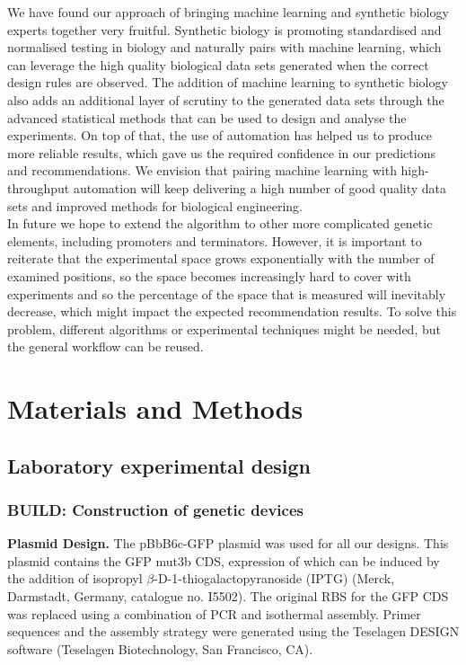 \documentclass{scrartcl}[2013/05/29]%
\begin{document}
We have found our approach of bringing machine learning and synthetic biology experts together very fruitful.
Synthetic biology is promoting standardised and normalised testing in biology and naturally pairs with machine learning, which can leverage the high quality biological data sets generated when the correct design rules are observed.
The addition of machine learning to synthetic biology also adds an additional layer of scrutiny to the generated data sets through the advanced statistical methods that can be used to design and analyse the experiments.
On top of that, the use of automation has helped us to produce more reliable results, which gave us the required confidence in our predictions and recommendations.
We envision that pairing machine learning with high-throughput automation will keep delivering a high number of good quality data sets and improved methods for biological engineering.\\

In future we hope to extend the algorithm to other more complicated genetic elements, including promoters and terminators.
However, it is important to reiterate that the experimental space grows exponentially with the number of examined positions, so the space becomes increasingly hard to cover with experiments and so the percentage of the space that is measured will inevitably decrease, which might impact the expected recommendation results.
To solve this problem, different algorithms or experimental techniques might be needed, but the general workflow can be reused.\\


\section{Materials and Methods}

\subsection{Laboratory experimental design}

\subsubsection{BUILD: Construction of genetic devices}

\textbf{Plasmid Design.}
The pBbB6c-GFP plasmid was used for all our designs.
This plasmid contains the GFP mut3b CDS, expression of which can be induced by the addition of isopropyl $\beta$-D-1-thiogalactopyranoside (IPTG) (Merck, Darmstadt, Germany, catalogue no. I5502).
The original RBS for the GFP CDS was replaced using a combination of PCR and isothermal assembly.
Primer sequences and the assembly strategy were generated using the Teselagen DESIGN software (Teselagen Biotechnology, San Francisco, CA).
\end{document}
